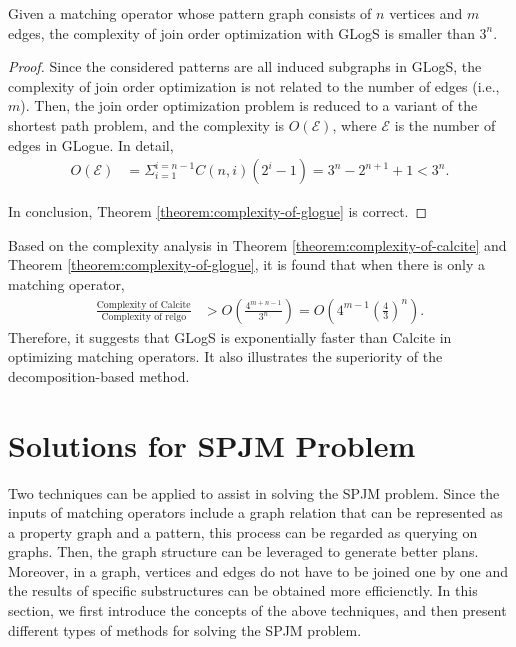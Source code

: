 \begin{theorem}
    \label{theorem:complexity-of-glogue}
    Given a matching operator whose pattern graph consists of $n$ vertices and $m$ edges, the complexity of join order optimization with GLogS is smaller than $3^n$.
\end{theorem}
\begin{proof}
    Since the considered patterns are all induced subgraphs in GLogS, the complexity of join order optimization is not related to the number of edges (i.e., $m$).
    Then, the join order optimization problem is reduced to a variant of the shortest path problem, and the complexity is $O(\mathcal{E})$, where $\mathcal{E}$ is the number of edges in GLogue.
    In detail, 
    \begin{equation*}
        \begin{split}
            O(\mathcal{E}) & = \Sigma_{i=1}^{i=n-1}C(n, i)(2^i - 1) = 3^n - 2^{n+1} +1 < 3^n.
        \end{split}
    \end{equation*}
    
    In conclusion, Theorem \ref{theorem:complexity-of-glogue} is correct.

\end{proof}

Based on the complexity analysis in Theorem \ref{theorem:complexity-of-calcite} and Theorem \ref{theorem:complexity-of-glogue}, it is found that when there is only a matching operator, 
\begin{equation*}
    \begin{split}
        \frac{\text{Complexity of Calcite}}{\text{Complexity of relgo}} & > O(\frac{4^{m+n-1}}{3^n}) = O(4^{m-1}(\frac{4}{3})^n).
    \end{split}
\end{equation*}
Therefore, it suggests that GLogS is exponentially faster than Calcite in optimizing matching operators.
It also illustrates the superiority of the decomposition-based method.

\iffalse
\section{Solutions for SPJM Problem}
Two techniques can be applied to assist in solving the SPJM problem.
Since the inputs of matching operators include a graph relation that can be represented as a property graph and a pattern, this process can be regarded as querying on graphs.
Then, the graph structure can be leveraged to generate better plans.
Moreover, in a graph, vertices and edges do not have to be joined one by one and the results of specific substructures can be obtained more efficienctly.
In this section, we first introduce the concepts of the above techniques, and then present different types of methods for solving the SPJM problem.

